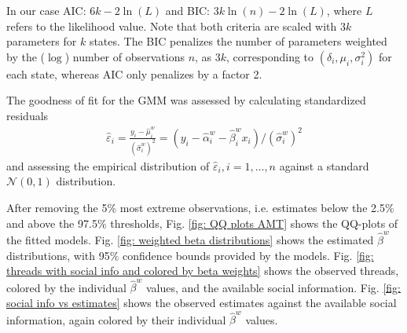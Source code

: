 \documentclass[9pt,a4paper,twocolumn,lineno]{article}
\begin{document}
In our case AIC: $6k-2\ln(L)$ and BIC: $3k\ln(n)-2\ln(L)$, where $L$ refers to the likelihood value. Note that both criteria are scaled with $3k$ parameters for $k$ states. The BIC penalizes the number of parameters weighted by the ($\log$) number of observations $n$, 
as $3k$, corresponding to $(\delta_i,\mu_i,\sigma^2_i)$ for each state, whereas AIC only penalizes by a factor 2.

The goodness of fit for the GMM was assessed by calculating standardized residuals
\begin{align}
 	\hat{\varepsilon}_i = \frac{y_i - \hat{\mu}^w_i}{(\hat{\sigma}^w_i)^2} = (y_i - \hat{\alpha}^w_i-\hat{\beta}^w_ix_i)/(\hat{\sigma}^w_i)^2 \label{eq: GMM residuals}
\end{align}
and assessing the empirical distribution of $\hat{\varepsilon}_i, i=1,\dots,n$ against a standard $\mathcal{N}(0,1)$ distribution.

After removing the 5\% most extreme observations, i.e. estimates below the 2.5\% and above the 97.5\% thresholds, Fig. \ref{fig: QQ plots AMT} shows the QQ-plots of the fitted models. Fig. \ref{fig: weighted beta distributions} shows the estimated $\hat{\beta}^w$ distributions, with 95\% confidence bounds provided by the models. Fig. \ref{fig: threads with social info and colored by beta weights} shows the observed threads, colored by the individual $\hat{\beta}^w$ values, and the available social information. Fig. \ref{fig: social info vs estimates} shows the observed estimates against the available social information, again colored by their individual $\hat{\beta}^w$ values.
\end{document}
